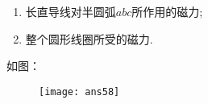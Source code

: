 \begin{enumerate}
    \begin{enumerate}[label=(\arabic*)]
        \item 长直导线对半圆弧$abc$所作用的磁力;
        \item 整个圆形线圈所受的磁力.
    \end{enumerate}
    \begin{solution}
        如图：
        \begin{figure}[H]
            \centering
            \texttt{[image: ans58]}
        \end{figure}
    \end{solution}
\end{enumerate}
